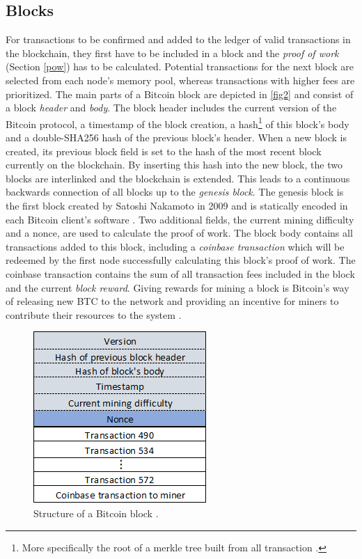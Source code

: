 \documentclass[a4paper,12pt,twoside]{report}
\begin{document}
\subsection{Blocks}
For transactions to be confirmed and added to the ledger of valid transactions in the blockchain, they first have to be included in a block and the \textit{proof of work} (Section \ref{pow}) has to be calculated. Potential transactions for the next block are selected from each node's memory pool, whereas transactions with higher fees are prioritized. The main parts of a Bitcoin block are depicted in \autoref{fig2} and consist of a block \textit{header} and \textit{body}. The block header includes the current version of the Bitcoin protocol, a timestamp of the block creation, a hash\footnote{More specifically the root of a merkle tree built from all transaction \cite{okupski2014bitcoin}.} of this block's body and a double-SHA256 hash of the previous block's header. When a new block is created, its previous block field is set to the hash of the most recent block currently on the blockchain. By inserting this hash into the new block, the two blocks are interlinked and the blockchain is extended. This leads to a continuous backwards connection of all blocks up to the \textit{genesis block}. The genesis block is the first block created by Satoshi Nakamoto in 2009 and is statically encoded in each Bitcoin client's software \cite{antonopoulos2017mastering}. Two additional fields, the current mining difficulty and a nonce, are used to calculate the proof of work. The block body contains all transactions added to this block, including a \textit{coinbase transaction} which will be redeemed by the first node successfully calculating this block's proof of work. The coinbase transaction contains the sum of all transaction fees included in the block and the current \textit{block reward}. Giving rewards for mining a block is Bitcoin's way of releasing new BTC to the network and providing an incentive for miners to contribute their resources to the system \cite{okupski2014bitcoin,antonopoulos2017mastering}.
\begin{figure}[ht]
	\centering
  \includegraphics[scale=0.7]{BlockExample.png}
	\caption{Structure of a Bitcoin block \cite{DSAwithTime,okupski2014bitcoin}.}
	\label{fig2}
\end{figure}
\end{document}
